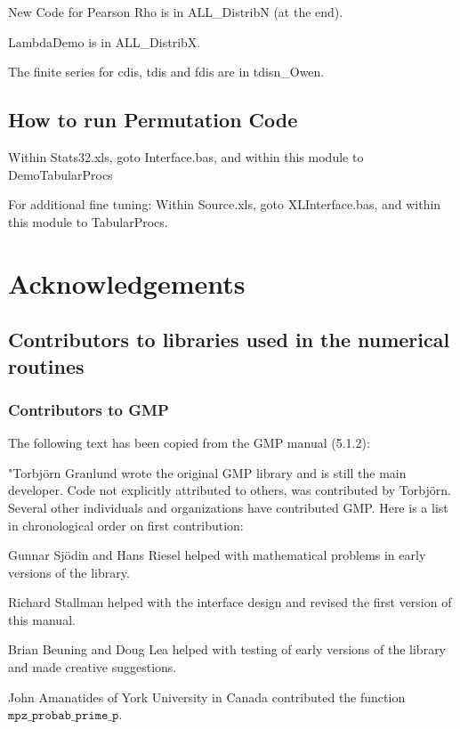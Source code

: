New Code for Pearson Rho is in ALL\_DistribN (at the end).

LambdaDemo is in ALL\_DistribX.

The finite series for cdis, tdis and fdis are in tdisn\_Owen.


\section{How to run Permutation Code}

Within Stats32.xls, goto Interface.bas, and within this module to DemoTabularProcs

For additional fine tuning: 
Within Source.xls, goto XLInterface.bas, and within this module to TabularProcs.





\chapter{Acknowledgements} 

\section{Contributors to libraries used in the numerical routines}

\subsection{Contributors to GMP}
\label{Contributors to GMP}
The following text has been copied from the GMP manual (5.1.2):

\vpara
"Torbj\"orn Granlund wrote the original GMP library and is still the main
developer.  Code not explicitly attributed to others, was contributed by
Torbj\"orn.  Several other individuals and organizations have contributed
GMP.  Here is a list in chronological order on first contribution:

\vpara
Gunnar Sj\"odin and Hans Riesel helped with mathematical problems in early
versions of the library.

\vpara
Richard Stallman helped with the interface design and revised the first
version of this manual.

\vpara
Brian Beuning and Doug Lea helped with testing of early versions of the
library and made creative suggestions.

\vpara
John Amanatides of York University in Canada contributed the function
$\mathtt{mpz\_probab\_prime\_p}$.

